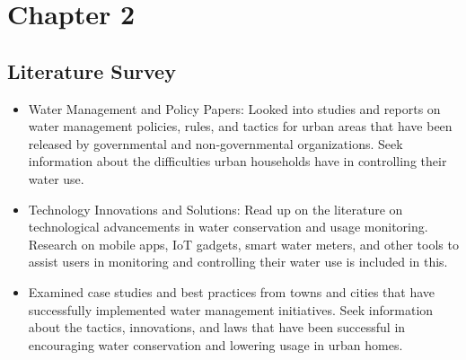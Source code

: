 \chapter{Chapter 2}
\graphicspath{{Chapter2/}}

\section{Literature Survey}


\begin{itemize}

	\item Water Management and Policy Papers: Looked into studies and reports on water management policies, rules, and tactics for urban areas that have been released by governmental and non-governmental organizations. Seek information about the difficulties urban households have in controlling their water use.
	\item Technology Innovations and Solutions: Read up on the literature on technological advancements in water conservation and usage monitoring. Research on mobile apps, IoT gadgets, smart water meters, and other tools to assist users in monitoring and controlling their water use is included in this.
	\item Examined case studies and best practices from towns and cities that have successfully implemented water management initiatives. Seek information about the tactics, innovations, and laws that have been successful in encouraging water conservation and lowering usage in urban homes.

\end{itemize}

